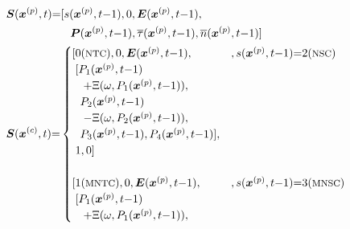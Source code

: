 \documentclass[\main/thesis.tex]{subfiles}
\begin{document}
\begin{align}
&\boldsymbol{S}(\boldsymbol{x}^{(p)}, t) {=} [ s(\boldsymbol{x}^{(p)}, t{-}1), 0, 
                                               \boldsymbol{E}(\boldsymbol{x}^{(p)}, t{-}1),
                                               \label{eq:DifferentiationStateChangeParent}\\
                                               &\hspace{2cm} \boldsymbol{P}(\boldsymbol{x}^{(p)}, t{-}1), \overline{\tau}(\boldsymbol{x}^{(p)}, t{-}1), 
                                               \overline{n}(\boldsymbol{x}^{(p)}, t{-}1) ]
\nonumber\\
&\boldsymbol{S}(\boldsymbol{x}^{(c)}, t) {=} \begin{cases}
                     [ 0 (\text{{\footnotesize NTC}}), 0, 
                       \boldsymbol{E}(\boldsymbol{x}^{(p)}, t{-}1),
                       &, s(\boldsymbol{x}^{(p)}, t{-}1) {=} 2 (\text{{\footnotesize NSC}})\\
                     \hspace{0.1cm}[ P_1(\boldsymbol{x}^{(p)}, t{-}1) \\
                     \hspace{0.35cm} {+} \Xi(\omega, P_1(\boldsymbol{x}^{(p)}, t{-}1)),\\
                     \hspace{0.25cm} P_2(\boldsymbol{x}^{(p)}, t{-}1) \\
                     \hspace{0.35cm} {-} \Xi(\omega, P_2(\boldsymbol{x}^{(p)}, t{-}1)),\\
                     \hspace{0.25cm} P_3(\boldsymbol{x}^{(p)}, t{-}1),
                                     P_4(\boldsymbol{x}^{(p)}, t{-}1) ],\\
                     \hspace{0.1cm} 1, 0 ] \\
                     \\
                     [ 1 (\text{{\footnotesize MNTC}}), 0, 
                       \boldsymbol{E}(\boldsymbol{x}^{(p)}, t{-}1),
                       &, s(\boldsymbol{x}^{(p)}, t{-}1) {=} 3 (\text{{\footnotesize MNSC}})\\
                     \hspace{0.1cm} [ P_1(\boldsymbol{x}^{(p)}, t{-}1) \\
                     \hspace{0.35cm} {+} \Xi(\omega, P_1(\boldsymbol{x}^{(p)}, t{-}1)),\\

\end{cases}
\end{align}
\end{document}
